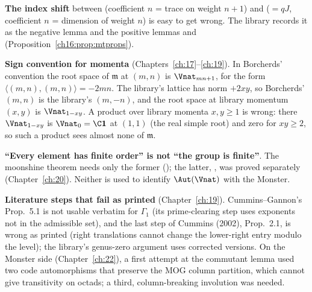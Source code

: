 \begin{warning}
\textbf{The index shift} between  (coefficient $n$ = trace on weight $n+1$) and 
($=qJ$, coefficient $n$ = dimension of weight $n$) is easy to get wrong.  The library records it as the negative lemma
 and the positive lemmas  and 
(Proposition~\ref{ch16:prop:mtprops}).
\end{warning}

\begin{warning}
\textbf{Sign convention for momenta} (Chapters~\ref{ch:17}--\ref{ch:19}).  In Borcherds'
convention the root space of $\mathfrak m$ at $(m,n)$ is $\Vnat_{mn+1}$, for the form $\langle(m,n),(m,n)\rangle=-2mn$.
The library's lattice  has norm $+2xy$, so Borcherds' $(m,n)$ is the library's $(m,-n)$, and
the root space at library momentum $(x,y)$ is $\Vnat_{1-xy}$.  A product over library momenta $x,y\ge1$ is wrong: there
$\Vnat_{1-xy}$ is $\Vnat_0=\C\mathbf 1$ at $(1,1)$ (the real simple root) and zero for $xy\ge2$, so such a product sees
almost none of $\mathfrak m$.
\end{warning}

\begin{warning}
\textbf{``Every element has finite order'' is not ``the group is finite''}.  The
moonshine theorem needs only the former (); the latter, , was proved
separately (Chapter~\ref{ch:20}).  Neither is used to identify $\Aut(\Vnat)$ with the Monster.
\end{warning}

\begin{warning}
\textbf{Literature steps that fail as printed} (Chapter~\ref{ch:19}).  Cummins--Gannon's
Prop.~5.1 is not usable verbatim for $\Gamma_1$ (its prime-clearing step uses exponents not in the admissible set), and
the last step of Cummins (2002), Prop.~2.1, is wrong as printed (right translations cannot change the lower-right entry
modulo the level); the library's genus-zero argument uses corrected versions.  On the Monster side
(Chapter~\ref{ch:22}), a first attempt at the commutant lemma used two code automorphisms that preserve the MOG column
partition, which cannot give transitivity on octads; a third, column-breaking involution was needed.
\end{warning}

